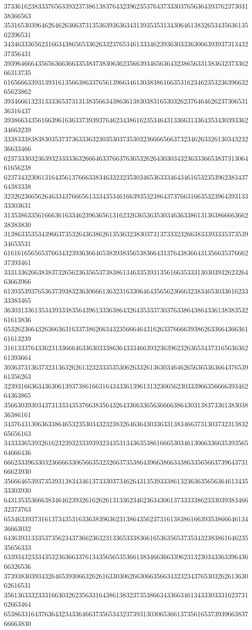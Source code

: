 37336162383337656339323738613837643239623537643733303765636439376237303138366563
35316530396462646263663731353639363634313935353134306461383265343563613562396531
34346333656231663438656533626332376534613334623936303336306639393731343237356431
39396466643565636636633538373830636235663934656364323865633138363237336266313735
61656663393139316135663863376561396634613038386166353162346235323639663265623862
39346661323133336537313138356634386361383038316530326237646462623730653136316437
39386634356166396163633739393764623438616235346431336631336435343039336234663239
33383338383830353737363336323035303735303236666566373234626332613034323236633466
62373330323639323333363266646337663763653262643030343236333665383731306461656238
62373432306131643561376663383463323235303465363334643461653235396238343764383338
32326236656264633437666561333435346166393532386437376631663532396439313333303631
31353863356166636163346239636561316232636536353034636338613136386666366238383830
31386335353439663735326436386261353632383037313733323266383339333537353934653531
61616165656537663432393636646538393835653836643137643836643135663537666237393461
33313362663838373265623635653738386134633539313561663533313030393262326463663966
61393539376536373938323630666136323163306464356562366632383465303361623333383465
36303133613534393338356439613336386432643533373037633864386433613838353261613836
65326236643263663631633738626634323566646431626337666639386263366436636161613239
31613337643362313366646336303338636433346639323639623263653437316563636261393664
30363731363732313632626132323335353062633261363034646265636536366437653961356263
32393166363436306139373861663164343361396131323065623033396635666639346264363865
35663039303437313334353766383564326433663365636666386430313837336138303836386161
34376431306363386465323530343232383264636430336331383466373130373231383265656163
34333365393261623239323339393234353134363538616665303461306633663539356564666436
66623339633032366663306566353232663735386439663866343863356566373964373166623930
35666465393735393138343461373330373462643135393338613236363565636461343533303930
64313535366638346462393261626261313362346236343061373333386233303938346632373763
65346339373161373435316336383963623138643562373161383861663935386664613436663032
64363931333537356234373662363231336533383661653635653735343238386164623535656333
63393432333435323636633761343565653536613834663663396231323034336339643666326536
37393830393432646539306632626163303062663066356634323234376530326261363062616531
35613633323331663032623563316438613832373538663433663461343330333162373162663464
65386331643763643234336466373565343237393130306536613735616537393966383766663830
